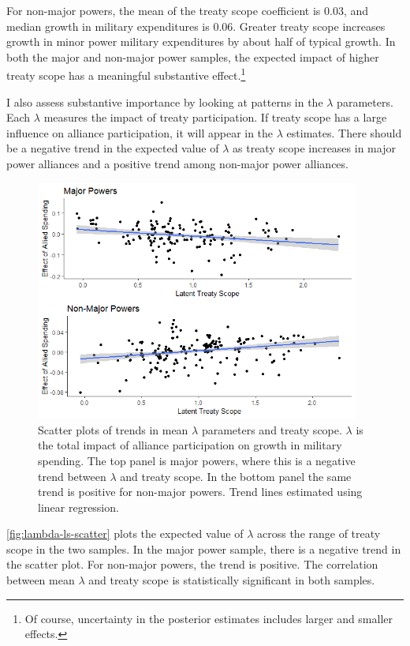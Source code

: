 \documentclass[12pt]{article}
\begin{document}
For non-major powers, the mean of the treaty scope coefficient is 0.03, and median growth in military expenditures is 0.06. 
Greater treaty scope increases growth in minor power military expenditures by about half of typical growth. 
In both the major and non-major power samples, the expected impact of higher treaty scope has a meaningful substantive effect.\footnote{Of course, uncertainty in the posterior estimates includes larger and smaller effects.}


I also assess substantive importance by looking at patterns in the $\lambda$ parameters. 
Each $\lambda$ measures the impact of treaty participation. 
If treaty scope has a large influence on alliance participation, it will appear in the $\lambda$ estimates. 
There should be a negative trend in the expected value of $\lambda$ as treaty scope increases in major power alliances and a positive trend among non-major power alliances. 


\begin{figure}[htbp]
	\centering
		\includegraphics[width=0.95\textwidth]{../figures/lambda-ls-scatter.png}
	\caption{Scatter plots of trends in mean $\lambda$ parameters and treaty scope. $\lambda$ is the total impact of alliance participation on growth in military spending. The top panel is major powers, where this is a negative trend between $\lambda$ and treaty scope. In the bottom panel the same trend is positive for non-major powers. Trend lines estimated using linear regression.}
	\label{fig:lambda-ls-scatter}
\end{figure}


\autoref{fig:lambda-ls-scatter} plots the expected value of $\lambda$ across the range of treaty scope in the two samples. 
In the major power sample, there is a negative trend in the scatter plot.
For non-major powers, the trend is positive.
The correlation between mean $\lambda$ and treaty scope is statistically significant in both samples. 
\end{document}
